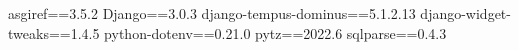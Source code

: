 asgiref==3.5.2
Django==3.0.3
django-tempus-dominus==5.1.2.13
django-widget-tweaks==1.4.5
python-dotenv==0.21.0
pytz==2022.6
sqlparse==0.4.3
